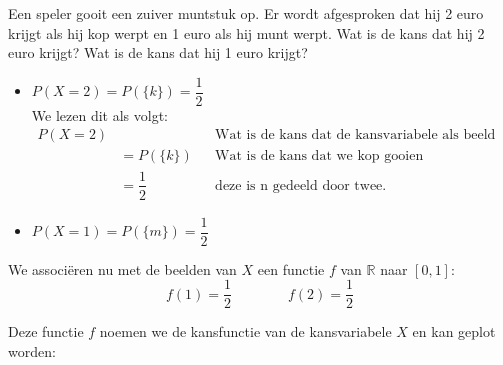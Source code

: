 \documentclass[a4paper,12pt, twoside]{article}
\begin{document}
Een speler gooit een zuiver muntstuk op. Er wordt afgesproken dat hij 2 euro krijgt als hij kop werpt en 1 euro als hij munt werpt. Wat is de kans dat hij 2 euro krijgt? Wat is de kans dat hij 1 euro krijgt?

\begin{itemize}
  \item $P(X=2)=P(\{k\})=\dfrac{1}{2}$\\
  We lezen dit als volgt:
  \begin{align*}
    P(X=2) &              && \mbox{Wat is de kans dat de kansvariabele als beeld 2 heeft}\\
           &=P(\{k\})     && \mbox{Wat is de kans dat we kop gooien}\\
           &=\dfrac{1}{2} && \mbox{deze is n gedeeld door twee.}
  \end{align*}
  \item $P(X=1)=P(\{m\})=\dfrac{1}{2}$
\end{itemize}


We associëren nu met de beelden van $X$ een functie $f$ van $\mathbb{R}$ naar $[0,1]$:
  $$f(1) = \dfrac{1}{2} \qquad\qquad f(2) = \dfrac{1}{2}$$

Deze functie $f$ noemen we de kansfunctie van de kansvariabele $X$ en kan geplot worden:
\begin{center}
\end{center}
\end{document}
